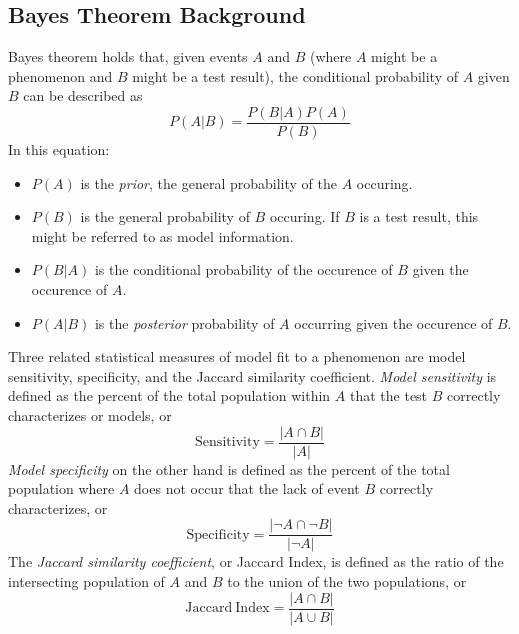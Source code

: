 \documentclass[12pt,letter]{article}
\begin{document}
	\subsection{Bayes Theorem Background}\label{sec:bayes_back}
		Bayes theorem holds that, given events $A$ and $B$ (where $A$ might be a phenomenon and $B$ might be a test result), the conditional probability of $A$ given $B$ can be described as
		\begin{equation}
		P(A|B)=\frac{P(B|A)P(A)}{P(B)}\label{eq_bayes}
		\end{equation}
		In this equation:
		\begin{itemize}
			\item $P(A)$ is the \textit{prior}, the general probability of the $A$ occuring.
			\item $P(B)$ is the general probability of $B$ occuring. If $B$ is a test result, this might be referred to as model information.
			\item $P(B|A)$ is the conditional probability of the occurence of $B$ given the occurence of $A$.
			\item $P(A|B)$ is the \textit{posterior} probability of $A$ occurring given the occurence of $B$.
		\end{itemize}

		Three related statistical measures of model fit to a phenomenon are model sensitivity, specificity, and the Jaccard similarity coefficient. \textit{Model sensitivity} is defined as the percent of the total population within $A$ that the test $B$ correctly characterizes or models, or
		\begin{equation}
		\mathrm{Sensitivity} = \frac{|A\cap B|}{|A|}\label{eq_sensitivity}
		\end{equation}
		\textit{Model specificity} on the other hand is defined as the percent of the total population where $A$ does not occur that the lack of event $B$ correctly characterizes, or 
		\begin{equation}
		\mathrm{Specificity} = \frac{|\neg A\cap \neg B|}{|\neg A|}
		\end{equation}
		The \textit{Jaccard similarity coefficient}, or Jaccard Index, is defined as the ratio of the intersecting population of $A$ and $B$ to the union of the two populations, or
		\begin{equation}
		\mathrm{Jaccard~Index} = \frac{|A\cap B|}{|A\cup B|}
		\end{equation}
\end{document}

